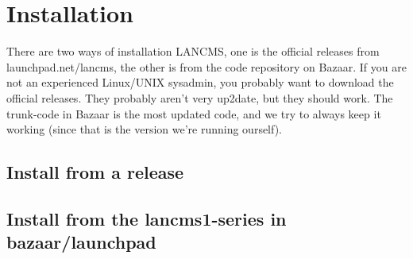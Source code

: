 \chapter{Installation}

There are two ways of installation LANCMS, one is the official releases from launchpad.net/lancms, the other is from the code repository on Bazaar.
If you are not an experienced Linux/UNIX sysadmin, you probably want to download the official releases. They probably aren't very up2date, but they should work.
The trunk-code in Bazaar is the most updated code, and we try to always keep it working (since that is the version we're running ourself).

\section{Install from a release}


\section{Install from the lancms1-series in bazaar/launchpad}

